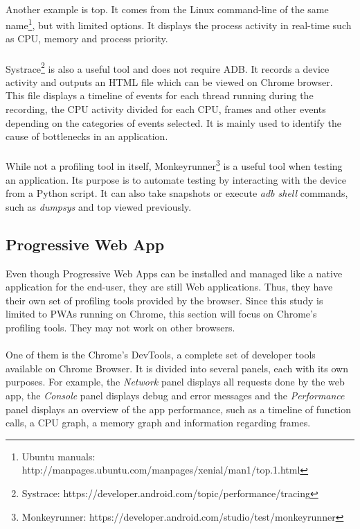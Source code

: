 \documentclass{kththesis}
\begin{document}
\paragraph{}
Another example is top. It comes from the Linux command-line of the same name\footnote{Ubuntu manuals: http://manpages.ubuntu.com/manpages/xenial/man1/top.1.html}, but with limited options. It displays the process activity in real-time such as CPU, memory and process priority.

\paragraph{}
Systrace\footnote{Systrace: https://developer.android.com/topic/performance/tracing} is also a useful tool and does not require ADB. It records a device activity and outputs an HTML file which can be viewed on Chrome browser. This file displays a timeline of events for each thread running during the recording, the CPU activity divided for each CPU, frames and other events depending on the categories of events selected. It is mainly used to identify the cause of bottlenecks in an application.

\paragraph{}
While not a profiling tool in itself, Monkeyrunner\footnote{Monkeyrunner: https://developer.android.com/studio/test/monkeyrunner} is a useful tool when testing an application. Its purpose is to automate testing by interacting with the device from a Python script. It can also take snapshots or execute \textit{adb shell} commands, such as \textit{dumpsys} and top viewed previously. 

\subsection{Progressive Web App}

Even though Progressive Web Apps can be installed and managed like a native application for the end-user, they are still Web applications. Thus, they have their own set of profiling tools provided by the browser. Since this study is limited to PWAs running on Chrome, this section will focus on Chrome's profiling tools. They may not work on other browsers.

\paragraph{}
One of them is the Chrome's DevTools, a complete set of developer tools available on Chrome Browser. It is divided into several panels, each with its own purposes. For example, the \textit{Network} panel displays all requests done by the web app, the \textit{Console} panel displays debug and error messages and the \textit{Performance} panel \cite{chrome_devtools_perf} displays an overview of the app performance, such as a timeline of function calls, a CPU graph, a memory graph and information regarding frames. 
\end{document}
